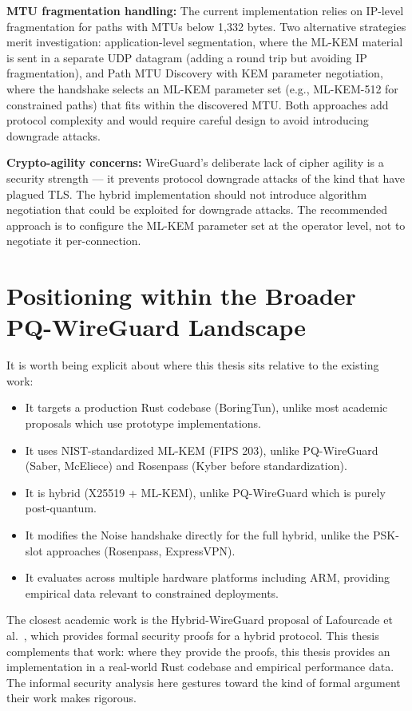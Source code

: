 \textbf{MTU fragmentation handling:} The current implementation relies on IP-level fragmentation for paths with MTUs below 1,332 bytes. Two alternative strategies merit investigation: application-level segmentation, where the ML-KEM material is sent in a separate UDP datagram (adding a round trip but avoiding IP fragmentation), and Path MTU Discovery with KEM parameter negotiation, where the handshake selects an ML-KEM parameter set (e.g., ML-KEM-512 for constrained paths) that fits within the discovered MTU. Both approaches add protocol complexity and would require careful design to avoid introducing downgrade attacks.

\textbf{Crypto-agility concerns:} WireGuard's deliberate lack of cipher agility is a security strength — it prevents protocol downgrade attacks of the kind that have plagued TLS. The hybrid implementation should not introduce algorithm negotiation that could be exploited for downgrade attacks. The recommended approach is to configure the ML-KEM parameter set at the operator level, not to negotiate it per-connection.

\section{Positioning within the Broader PQ-WireGuard Landscape}

It is worth being explicit about where this thesis sits relative to the existing work:

\begin{itemize}
\item It targets a production Rust codebase (BoringTun), unlike most academic proposals which use prototype implementations.

\item It uses NIST-standardized ML-KEM (FIPS 203), unlike PQ-WireGuard (Saber, McEliece) and Rosenpass (Kyber before standardization).

\item It is hybrid (X25519 + ML-KEM), unlike PQ-WireGuard which is purely post-quantum.

\item It modifies the Noise handshake directly for the full hybrid, unlike the PSK-slot approaches (Rosenpass, ExpressVPN).

\item It evaluates across multiple hardware platforms including ARM, providing empirical data relevant to constrained deployments.
\end{itemize}

The closest academic work is the Hybrid-WireGuard proposal of Lafourcade et al.~\cite{lafourcade2025hybrid}, which provides formal security proofs for a hybrid protocol. This thesis complements that work: where they provide the proofs, this thesis provides an implementation in a real-world Rust codebase and empirical performance data. The informal security analysis here gestures toward the kind of formal argument their work makes rigorous.
